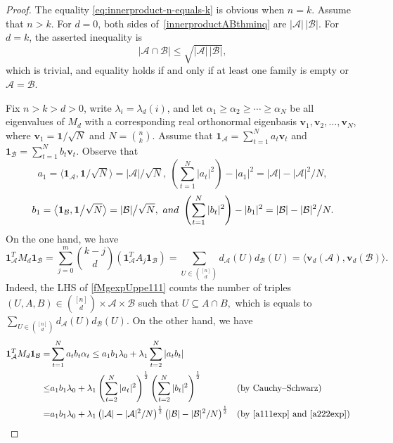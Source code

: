 \documentclass[10pt,a4paper]{amsart}
\numberwithin{equation}{section}
\def\A{\mathcal{A}}
\def\B{\mathcal{B}}
\def\v{\mathbf{v}}
\def\1{\mathbf{1}}
\begin{document}
\begin{proof}
The equality \eqref{eq:innerproduct-n-equals-k} is obvious when $n=k$.
Assume that $n>k$.
For $d=0$, both sides of~\eqref{innerproductABthminq} are
$|\mathcal{A}|\,|\mathcal{B}|$.
For $d=k$, the asserted inequality is
\[
|\mathcal{A}\cap\mathcal{B}|
\leq \sqrt{|\mathcal{A}|\,|\mathcal{B}|},
\]
which is trivial, and equality
holds if and only if at least one family is empty or
$\mathcal{A}=\mathcal{B}$.


Fix $n>k>d>0$, write $\lambda_i=\lambda _d(i)$,
and let $\alpha_1\geq \alpha_2\geq \cdots \geq \alpha_N$ be all eigenvalues of $M_d$ with a corresponding real orthonormal eigenbasis
$\v_1,\v_2, \ldots ,\v_N$, where $\v_1=\1\big/\sqrt{N}$ and $N=\binom{n}{k}$.
Assume that $\1_\A=\sum_{t=1}^Na_t \v_t$
and $\1_\B=\sum_{t=1}^Nb_t \v_t$.
Observe that
\begin{equation}\label{a111exp}
a_1=\big\langle \1_\A,\1\big/\sqrt{N}\big\rangle=|\A| \big/\sqrt{N},
~ \left(\sum_{t=1}^N |a_t|^2\right)-|a_1|^2=|\A|-|\A|^2\big/ N,
\end{equation}
\begin{equation}\label{a222exp}
b_1=\big\langle \1_\B,\1\big/\sqrt{N}\big\rangle=|\B| \big/\sqrt{N},
~{\rm and~} \left(\sum_{t=1}^N |b_t|^2\right)-|b_1|^2=|\B|-|\B|^2\big/ N.
\end{equation}
On the one hand, we have
\begin{equation}\label{fMgexpUppe111}
\1_\A^TM_d \1_\B
=\sum_{j=0}^m \binom{k-j}{d} \left(\1_\A^TA_j\1_\B\right)
=\sum_{U\in \binom{[n]}{d}}
d_{\A}(U) d_{\B}(U)
=\big\langle \mathbf{v}_d(\A),\mathbf{v}_d(\B)\big\rangle.
\end{equation}
Indeed, the LHS of \eqref{fMgexpUppe111} counts the number of triples $(U,A,B)\in \binom {[n]}{d}\times \A \times \B$ such that $U\subseteq A\cap B,$ which is equals to
$\sum_{U\in \binom {[n]}{d}}
d_{\A}(U) d_{\B}(U)$.
On the other hand, we have
\begin{align}\label{ABcrossinq111}
\1_\A^TM_d \1_\B
=& \sum_{t=1}^N a_t b_t \alpha_t
\leq a_1 b_1 \lambda _0 + \lambda _1 \sum_{t=2}^N |a_t b_t |\\ \label{ABcrossinq222}
\leq & a_1 b_1\lambda _0 + \lambda _1
\left(\sum_{t=2}^N |a_t|^2\right)^{\frac{1}{2}}
\left(\sum_{t=2}^N |b_t|^2\right)^{\frac{1}{2}}
&& \text {(by Cauchy--Schwarz)}\\ \nonumber
=& a_1 b_1 \lambda _0 + \lambda _1\left(|\A|-|\A|^2/ N \right)^{\frac{1}{2}}
\left(|\B|-|\B|^2/ N \right)^{\frac{1}{2}}
&& \text {(by  \eqref{a111exp} and \eqref{a222exp})}\\\label{ABcrossinq333}

\end{align}
\end{proof}
\end{document}
